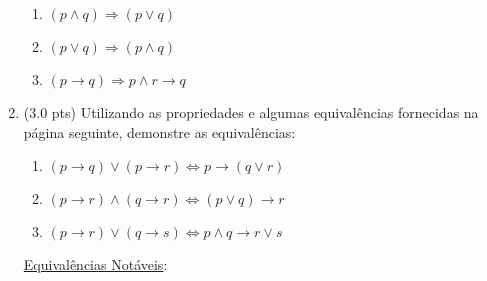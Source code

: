 \documentclass[12pt]{article}
\begin{document}
\begin{enumerate}
\begin{enumerate}



\item $(p \wedge q) \Rightarrow (p \vee q)$
\item $(p \vee q) \Rightarrow (p \wedge q)$


\item $(p \rightarrow q) \Rightarrow p \wedge r \rightarrow q $

\end{enumerate}


\item (3.0 pts) Utilizando as propriedades e algumas equivalências
fornecidas na página seguinte, demonstre as equivalências:

\begin{enumerate}
\setlength{\itemsep}{-2pt}


\item  $(p \rightarrow q) \vee (p \rightarrow r) \Leftrightarrow p  \rightarrow  (q \vee r) $ %



\item  $(p \rightarrow r) \wedge (q \rightarrow r) \Leftrightarrow (p \vee  q) \rightarrow r $ %


\item $(p \rightarrow r)  \vee (q \rightarrow s) \Leftrightarrow p \wedge q \rightarrow  r \vee s $  %




\end{enumerate}


\newpage

\underline{{\large Equivalências Notáveis}}:

{\small
\begin{description}
\setlength{\itemsep}{-2pt}


\end{description}}
\end{enumerate}
\end{document}
